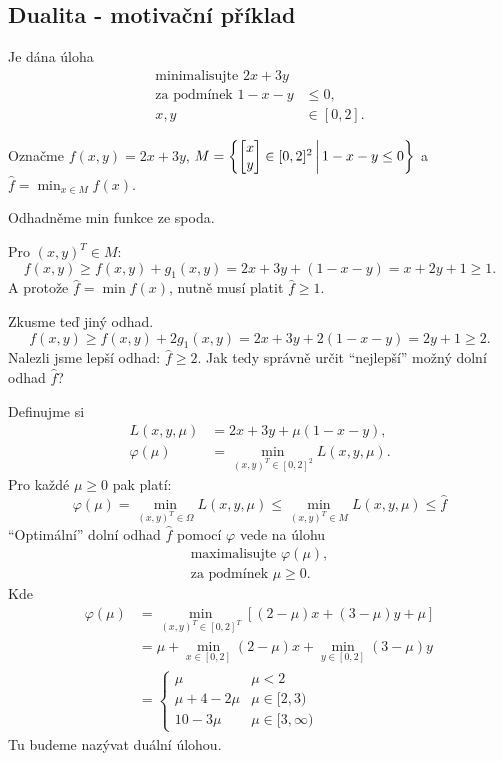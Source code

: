 \subsection{Dualita - motivační příklad}
Je dána úloha
\begin{align*}
    \text{minimalisujte } 2x+3y \\
    \text{za podmínek } 1-x-y &\leq 0, \\ 
    x,y &\in [0,2].
\end{align*}

Označme $f(x,y) = 2x + 3y$,
$
    M = \left\lbrace 
    \begin{bmatrix}
        x \\
        y
    \end{bmatrix} \in [0,2]^2 \, \middle| \, 1 - x - y \leq 0 \right\rbrace
$
a $\hat f = \min_{x\in M} f(x)$.

Odhadněme min funkce ze spoda. 

Pro $(x, y)^T \in M$: \[f(x, y) \geq f(x,y) + g_1(x,y) = 2x + 3y + (1-x-y) = x+2y+1 \geq 1.\]
A protože $\hat f = \min f(x)$, nutně musí platit $\hat f \geq 1$.

Zkusme teď jiný odhad.
\[f(x, y) \geq f(x,y) + 2g_1(x,y) = 2x + 3y + 2(1-x-y) = 2y + 1 \geq 2.\]
Nalezli jsme lepší odhad: $\hat f \geq 2$. Jak tedy správně určit \enquote{nejlepší} možný dolní odhad $\hat f$?

Definujme si
\begin{align*}
    L(x, y, \mu) &= 2x + 3y + \mu(1-x-y), \\
    \varphi(\mu) &= \min_{(x, y)^T \in [0,2]^2}L(x, y, \mu).
\end{align*}
Pro každé $\mu \geq 0$ pak platí:
\[
    \varphi(\mu) = \min_{(x, y)^T \in \Omega}L(x, y, \mu) \leq \min_{(x, y)^T \in M}L(x, y, \mu) \leq \hat f
\]
\enquote{Optimální} dolní odhad $\hat f$ pomocí $\varphi$ vede na úlohu
\begin{align*}
    \text{maximalisujte } \varphi(\mu), \\
    \text{za podmínek } \mu \geq 0.
\end{align*}
Kde
\begin{align*}
    \varphi(\mu) &= \min_{(x, y)^T \in [0,2]^T} \left[(2-\mu)x + (3-\mu)y + \mu\right] \\
    &= \mu + \min_{x \in [0,2]}(2-\mu)x + \min_{y \in [0,2]}(3-\mu)y \\
    &= 
    \begin{cases}
        \mu & \mu < 2 \\
        \mu + 4 - 2\mu & \mu \in [2, 3) \\
        10 - 3\mu & \mu \in [3, \infty)
    \end{cases}
\end{align*}
Tu budeme nazývat duální úlohou.

